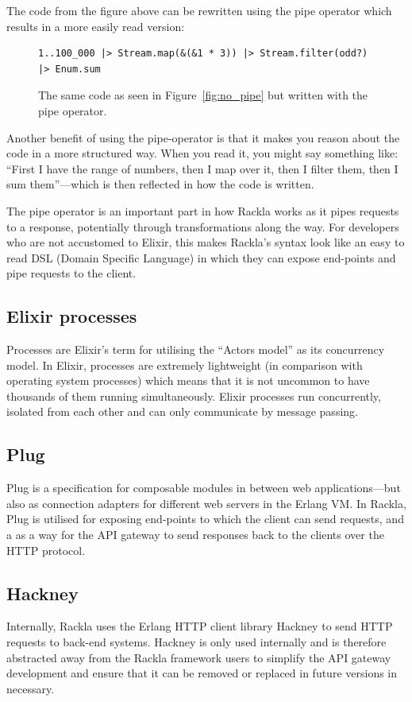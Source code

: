 \documentclass{cslthse-msc}
\begin{document}
\noindent The code from the figure above can be rewritten using the pipe operator which results in a more easily read version:

\begin{figure}[H]
  \centering
\begin{lstlisting}[breaklines=true,frame=single]
1..100_000 |> Stream.map(&(&1 * 3)) |> Stream.filter(odd?) |> Enum.sum
\end{lstlisting}
  \caption{The same code as seen in Figure~\ref{fig:no_pipe} but written with the pipe operator.}
\end{figure}

Another benefit of using the pipe-operator is that it makes you reason about the code in a more structured way. When you read it, you might say something like: \enquote{First I have the range of numbers, then I map over it, then I filter them, then I sum them}---which is then reflected in how the code is written.

The pipe operator is an important part in how Rackla works as it pipes requests to a response, potentially through transformations along the way. For developers who are not accustomed to Elixir, this makes Rackla's syntax look like an easy to read DSL (Domain Specific Language) in which they can expose end-points and pipe requests to the client.

\subsection{Elixir processes}
Processes are Elixir's term for utilising the \enquote{Actors model} as its concurrency model. In Elixir, processes are extremely lightweight (in comparison with operating system processes) which means that it is not uncommon to have thousands of them running simultaneously. Elixir processes run concurrently, isolated from each other and can only communicate by message passing\cite{elixir_processes}.

\subsection{Plug}
Plug is a specification for composable modules in between web applications---but also as connection adapters for different web servers in the Erlang VM\cite{plug}. In Rackla, Plug is utilised for exposing end-points to which the client can send requests, and a as a way for the API gateway to send responses back to the clients over the HTTP protocol.

\subsection{Hackney}
Internally, Rackla uses the Erlang HTTP client library Hackney\cite{hackney} to send HTTP requests to back-end systems. Hackney is only used internally and is therefore abstracted away from the Rackla framework users to simplify the API gateway development and ensure that it can be removed or replaced in future versions in necessary.
\end{document}
